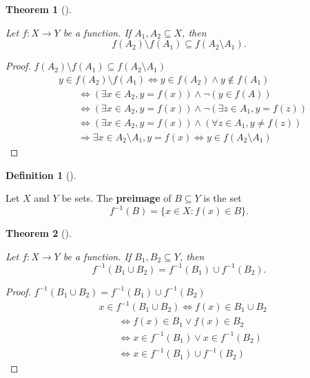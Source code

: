 \documentclass[
  letterpaper,
  10pt,
  reqno,
  twopage,
  openany]{book}
\theoremstyle{plain}
\theoremstyle{definition}
\theoremstyle{definition}
\newtheorem{definition}{Definition}[chapter]
\theoremstyle{definition}
\theoremstyle{plain}
\theoremstyle{plain}
\newtheorem{theorem}{Theorem}[chapter]
\theoremstyle{remark}
\begin{document}
\leavevmode{}%
\begin{theorem}[]\label{thm-function-setminus}

Let \(f:X\to Y\) be a function. If \(A_1, A_2\subseteq X\), then \[
f(A_2)\setminus f(A_1) \subseteq f(A_2\setminus A_1).
\]

\end{theorem}

\begin{proof}

\(f(A_2)\setminus f(A_1) \subseteq f(A_2\setminus A_1)\) \begin{align*}
& y\in f(A_2)\setminus f(A_1) \Leftrightarrow y\in f(A_2) \land y\notin f(A_1) \\
& \qquad \Leftrightarrow (\exists x\in A_2, y=f(x) )\land \neg (y\in f(A)) \\
& \qquad \Leftrightarrow (\exists x\in A_2, y=f(x) )\land \neg (\exists z\in A_1, y=f(z)) \\
& \qquad \Leftrightarrow (\exists x\in A_2, y=f(x) )\land (\forall z\in A_1, y\neq f(z)) \\
& \qquad \Longrightarrow \exists x\in A_2\setminus A_1, y=f(x) \Leftrightarrow y\in f(A_2\setminus A_1) 
\end{align*}

\end{proof}

\leavevmode{}%
\begin{definition}[]\label{def-preimage}

Let \(X\) and \(Y\) be sets. The  \textbf{preimage} of
\(B\subseteq Y\) is the set \[
f^{-1}(B)=\{x\in X : f(x)\in B\}.
\]

\end{definition}

\leavevmode{}%
\begin{theorem}[]\label{thm-function-cup}

Let \(f:X\to Y\) be a function. If \(B_1, B_2\subseteq Y\), then \[
f^{-1}(B_1\cup B_2)=f^{-1}(B_1)\cup f^{-1}(B_2).
\]

\end{theorem}

\begin{proof}

\(f^{-1}(B_1\cup B_2)=f^{-1}(B_1)\cup f^{-1}(B_2)\) \begin{align*}
& x\in f^{-1}(B_1\cup B_2) \Leftrightarrow   f(x)\in B_1 \cup B_2  \\ 
& \qquad \Leftrightarrow f(x) \in B_1 \lor f(x)\in B_2 \\ 
& \qquad \Leftrightarrow x\in f^{-1}(B_1) \lor x\in f^{-1}(B_2)  \\ 
& \qquad \Leftrightarrow x\in f^{-1}(B_1)\cup f^{-1}(B_2)
\end{align*}

\end{proof}
\end{document}
